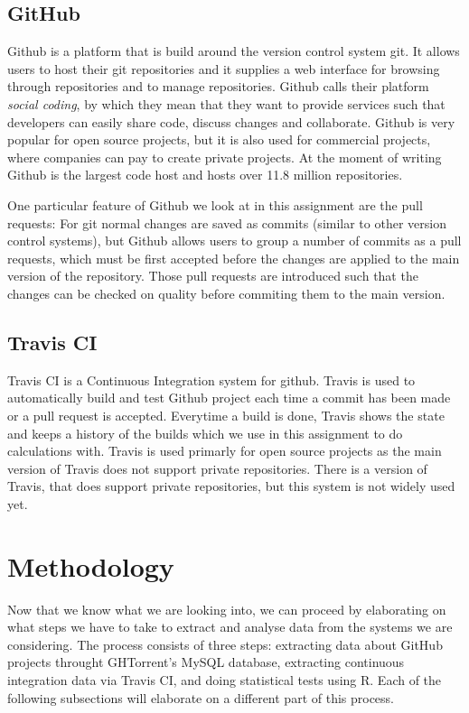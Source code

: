 \documentclass[a4paper,11pt]{article}
\begin{document}
		\subsection{GitHub}
			Github\cite{github} is a platform that is build around the version control system git.
			It allows users to host their git repositories and it supplies a web interface for browsing through repositories and
			to manage repositories.
			Github calls their platform \emph{social coding}, by which they mean that they want to provide services such that
			developers can easily share code, discuss changes and collaborate.
			Github is very popular for open source projects, but it is also used for commercial projects, where companies can pay
			to create private projects.
			At the moment of writing Github is the largest code host and hosts over 11.8 million repositories.
			
			One particular feature of Github we look at in this assignment are the pull requests: 
			For git normal changes are saved as commits (similar to other version control systems),
			but Github allows users to group a number of commits as a pull requests, which must be first accepted before the
			changes are applied to the main version of the repository.
			Those pull requests are introduced such that the changes can be checked on quality before commiting them to the main
			version.
		
		\subsection{Travis CI}
		  Travis CI\cite{travis} is a Continuous Integration system for github.
		  Travis is used to automatically build and test Github project each time a commit has been made or a pull request
		  is accepted.
		  Everytime a build is done, Travis shows the state and keeps a history of the builds which we use in this assignment
		  to do calculations with.
		  Travis is used primarly for open source projects as the main version of Travis does not support private
		  repositories.
		  There is a version of Travis, that does support private repositories, but this system is not widely used yet.
		  
		  
		
	\section{Methodology}
		Now that we know what we are looking into, we can proceed by elaborating on what steps we have to take to extract and analyse data from the systems we are considering. The process consists of three steps: extracting data about GitHub projects throught GHTorrent's MySQL database, extracting continuous integration data via Travis CI, and doing statistical tests using R. Each of the following subsections will elaborate on a different part of this process.
		
\end{document}
